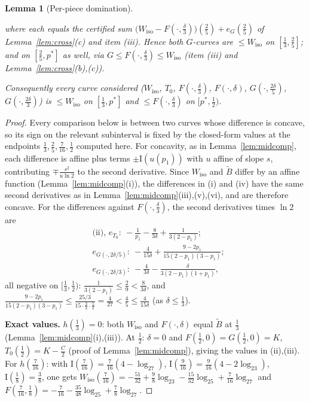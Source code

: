 \documentclass[journal]{IEEEtran}
\newtheorem{lemma}{Lemma}
\theoremstyle{definition}
\newcommand{\lgg}{\log_2}
\newcommand{\CC}{C}
\begin{document}
\begin{lemma}[Per-piece domination]
\begin{enumerate}
where each equals the certified sum
$\bigl(W_{\mathrm{iso}}-F(\cdot,\tfrac\delta3)\bigr)(\tfrac25)+e_G(\tfrac25)$
of Lemma~\ref{lem:cross}(c) and item (iii). Hence both $G$-curves are
$\le W_{\mathrm{iso}}$ on $[\tfrac13,\tfrac25]$; and on $[\tfrac25,p^*]$ as
well, via $G\le F(\cdot,\tfrac\delta3)\le W_{\mathrm{iso}}$ (item (iii) and
Lemma~\ref{lem:cross}(b),(c)).
\end{enumerate}
Consequently every curve considered ($W_{\mathrm{iso}}$, $T_0$,
$F(\cdot,\tfrac\delta3)$, $F(\cdot,\delta)$, $G(\cdot,\tfrac{2\delta}5)$,
$G(\cdot,\tfrac{2\delta}3)$) is $\le W_{\mathrm{iso}}$ on $[\tfrac13,p^*]$
and $\le F(\cdot,\tfrac\delta3)$ on $[p^*,\tfrac12)$.
\end{lemma}

\begin{proof}
Every comparison below is between two curves whose difference is concave, so
its sign on the relevant subinterval is fixed by the closed-form values at the
endpoints $\tfrac13,\tfrac25,\tfrac7{16},\tfrac12$ computed here.
For concavity, as in Lemma~\ref{lem:midcomp}, each difference is affine
plus terms $\pm \mathrm I(u(p_1))$ with $u$ affine of slope $s$, contributing
$\mp\tfrac{s^2}{u\ln2}$ to the second derivative. Since $W_{\mathrm{iso}}$
and $\tilde B$ differ by an affine function
(Lemma~\ref{lem:midcomp}(i)), the differences in (i) and (iv) have the same
second derivatives as in Lemma~\ref{lem:midcomp}(iii),(v),(vi), and are
therefore concave. For
the differences against $F(\cdot,\tfrac\delta3)$, the second derivatives
times $\ln2$ are
\[
\begin{aligned}
  &\text{(ii), }e_{T_0}:\ -\tfrac1{p_1}-\tfrac8{3\delta}+\tfrac1{3(2-p_1)};\\
  &e_{G(\cdot,2\delta/5)}:\
  -\tfrac4{15\delta}+\tfrac{9-2p_1}{15(2-p_1)(3-p_1)};\\
  &e_{G(\cdot,2\delta/3)}:\
  -\tfrac4{3\delta}-\tfrac{\delta}{3(2-p_1)(1+p_1)},
\end{aligned}
\]
all negative on $[\tfrac13,\tfrac12)$: $\tfrac1{3(2-p_1)}\le\tfrac29<
\tfrac8{3\delta}$, and $\tfrac{9-2p_1}{15(2-p_1)(3-p_1)}
\le\tfrac{25/3}{15\cdot\frac32\cdot\frac52}=\tfrac4{27}
<\tfrac45\le\tfrac4{15\delta}$ (as $\delta\le\tfrac13$).

\textbf{Exact values.} $h(\tfrac13)=0$: both $W_{\mathrm{iso}}$ and
$F(\cdot,\delta)$ equal $\tilde B$ at $\tfrac13$
(Lemma~\ref{lem:midcomp}(i),(iii)). At $\tfrac12$: $\delta=0$ and
$F(\tfrac12,0)=G(\tfrac12,0)=K$, $T_0(\tfrac12)=K-\tfrac{\CC}2$ (proof of
Lemma~\ref{lem:midcomp}), giving the values in (ii),(iii). For
$h(\tfrac7{16})$: with $\mathrm I(\tfrac7{16})=\tfrac7{16}(4-\lgg7)$,
$\mathrm I(\tfrac9{16})=\tfrac9{16}(4-2\lgg3)$, $\mathrm I(\tfrac18)=\tfrac38$, one gets
$W_{\mathrm{iso}}(\tfrac7{16})=-\tfrac{51}{32}+\tfrac98\lgg3
-\tfrac{15}{32}\lgg5+\tfrac7{16}\lgg7$ and
$F(\tfrac7{16},\tfrac18)=-\tfrac7{16}-\tfrac{35}{48}\lgg5
+\tfrac78\lgg7$.


\end{proof}
\end{document}
